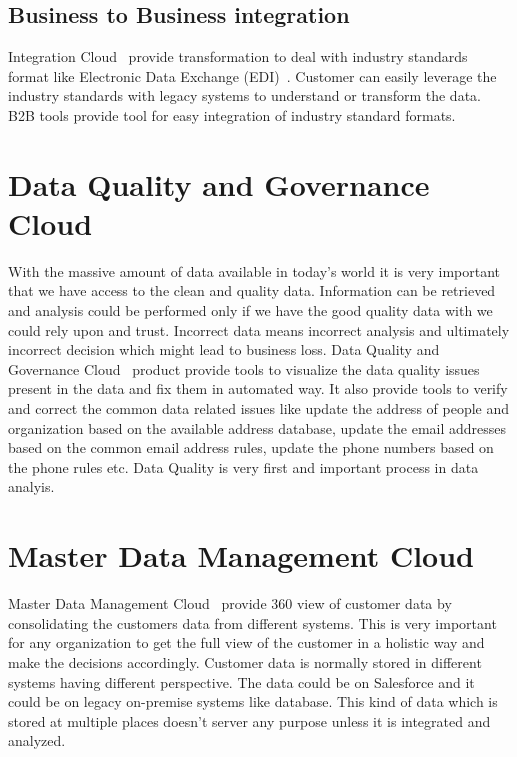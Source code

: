 \subsection{Business to Business integration}

Integration Cloud~\cite{hid-sp18-511-iics} provide transformation to deal with industry standards format like Electronic Data Exchange (EDI)~\cite{hid-sp18-511-edi}. Customer can easily leverage the industry standards with legacy systems to understand or transform the data. B2B tools provide tool for easy integration of industry standard formats.

\section{Data Quality and Governance Cloud}

With the massive amount of data available in today's world it is very
important that we have access to the clean and quality data. Information can be
retrieved and analysis could be performed only if we have the good
quality data with we could rely upon and trust. Incorrect data means incorrect analysis and ultimately incorrect decision which might lead to business loss. Data Quality and
Governance Cloud~\cite{hid-sp18-511-iics} product provide tools to
visualize the data quality issues present in the data and fix them in automated way. It
also provide tools to verify and correct the common data related
issues like update the address of people and organization based on the
available address database, update the email addresses based on the
common email address rules, update the phone numbers based on the phone rules etc. Data Quality is very first and important process in data analyis.

\section{Master Data Management Cloud}
Master Data Management Cloud~\cite{hid-sp18-511-iics} provide 360 view
of customer data by consolidating the customers data from different
systems. This is very important for any organization to get the full view of the customer in a holistic way and make the decisions accordingly. Customer data is normally stored in different systems having different perspective. The data could be on Salesforce\cite{hid-sp18-511-salesforce} and it could be on legacy on-premise systems like database. This kind of data which is stored at multiple places doesn't server any purpose unless it is integrated and analyzed.

